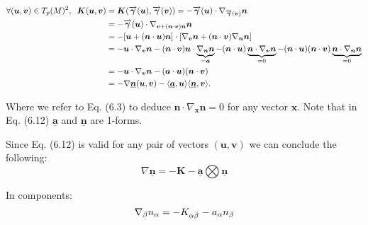 \documentclass[12pt]{article}
\renewcommand{\vec}[1]{\bm{#1}}
\numberwithin{equation}{section}
\numberwithin{theorem}{subsection}
\begin{document}
\begin{align}

    \forall (\vec{u},\vec{v}) \in T_{p}(M)^{2},  \; \; \vec{K}(\vec{u},\vec{v}) &= \vec{K}(\overrightarrow{\vec{\gamma}}(\vec{u}),\overrightarrow{\vec{\gamma}}(\vec{v})) = - \overrightarrow{\vec{\gamma}}(\vec{u}) \cdot \nabla_{\overrightarrow{\vec{\gamma}}(\vec{v})}\vec{n} \notag \\ 

    &= - \overrightarrow{\vec{\gamma}}(\vec{u}) \cdot \nabla_{\vec{v}+(\vec{n} \cdot \vec{v})\vec{n}}\vec{n}\notag \\

    &= -[\vec{u}+(\vec{n} \cdot \vec{u})\vec{n}]\cdot [\nabla_{\vec{v}}\vec{n}+(\vec{n}\cdot \vec{v})\nabla_{\vec{n}}\vec{n}] \notag \\ &= -\vec{u} \cdot \nabla_{\vec{v}}\vec{n} - (\vec{n}\cdot \vec{v})\vec{u} \cdot \underbrace{\nabla_{\vec{n}}\vec{n}}_{= \vec{a}} - (\vec{n} \cdot \vec{u})\underbrace{\vec{n} \cdot \nabla_{\vec{v}}\vec{n}}_{= 0} - (\vec{n}\cdot \vec{u})(\vec{n} \cdot \vec{v})\underbrace{\vec{n} \cdot \nabla_{\vec{n}}\vec{n}}_{= 0} \notag

     \\ &= -\vec{u} \cdot \nabla_{\vec{v}}\vec{n} - (\vec{a} \cdot \vec{u})(\vec{n} \cdot \vec{v})\notag \\ 

     &= - \nabla{\underline{\vec{n}}}(\vec{u},\vec{v}) - \langle \underline{\vec{a}},\vec{u} \rangle \langle \underline{\vec{n}}, \vec{v} \rangle.

\end{align}

Where we refer to Eq. (6.3) to deduce $\vec{n} \cdot \nabla_{\vec{x}}\vec{n} = 0$ for any vector $\vec{x}$. Note that in Eq. (6.12) $\underline{\vec{a}}$ and $\underline{\vec{n}}$ are 1-forms. 

Since Eq. (6.12) is valid for any pair of vectors $(\vec{u},\vec{v})$ we can conclude the following: \begin{equation} \boxed{\nabla\vec{\underline{n}} = -\vec{K} - \vec{\underline{a}} \bigotimes \vec{\underline{n}}}   \end{equation} 

In components: \begin{equation*}

    \nabla_{\beta}n_{\alpha} = -\tensor{K}{_\alpha_\beta} - a_{\alpha}n_{\beta}

\end{equation*}
\end{document}
